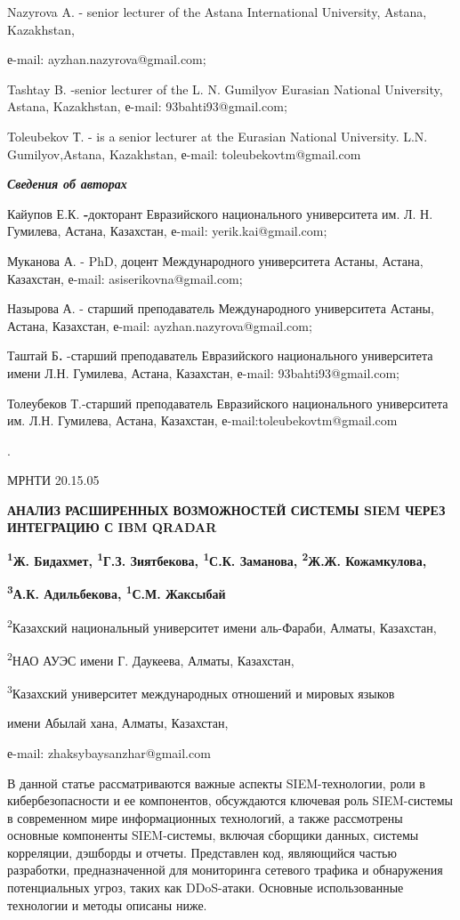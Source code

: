 Nazyrova A. - senior lecturer of the Astana International University,
Astana, Kazakhstan,

е-mail: ayzhan.nazyrova@gmail.com;

Tashtay B. -senior lecturer of the L. N. Gumilyov Eurasian National
University, Astana, Kazakhstan, е-mail: 93bahti93@gmail.com;

Toleubekov Т. - is a senior lecturer at the Eurasian National
University. L.N. Gumilyov,Astana, Kazakhstan, е-mail:
toleubekovtm@gmail.com

\emph{\textbf{Сведения об авторах}}

Кайупов Е.К. \textbf{-}докторант Евразийского национального университета
им. Л. Н. Гумилева, Астана, Казахстан, е-mail: yerik.kai@gmail.com;

Муканова А. - PhD, доцент Международного университета Астаны, Астана,
Казахстан, е-mail: asiserikovna@gmail.com;

Назырова А. - старший преподаватель Международного университета Астаны,
Астана, Казахстан, е-mail: ayzhan.nazyrova@gmail.com;

Таштай Б\textbf{.} -старший преподаватель Евразийского национального
университета имени Л.Н. Гумилева, Астана, Казахстан, е-mail:
93bahti93@gmail.com;

Толеубеков Т.-старший преподаватель Евразийского национального
университета им. Л.Н. Гумилева, Астана, Казахстан,
е-mail:toleubekovtm@gmail.com

.

МРНТИ 20.15.05

\textbf{АНАЛИЗ РАСШИРЕННЫХ ВОЗМОЖНОСТЕЙ СИСТЕМЫ SIEM ЧЕРЕЗ ИНТЕГРАЦИЮ С
IBM QRADAR}

\textbf{\textsuperscript{1}Ж. Бидахмет, \textsuperscript{1}Г.З.
Зиятбекова, \textsuperscript{1}С.К. Заманова, \textsuperscript{2}Ж.Ж.
Кожамкулова,}

\textbf{\textsuperscript{3}А.К. Адильбекова, \textsuperscript{1}С.М.
Жаксыбай}

\textsuperscript{2}Казахский национальный университет имени аль-Фараби,
Алматы, Казахстан,

\textsuperscript{2}НАО АУЭС имени Г. Даукеева, Алматы, Казахстан,

\textsuperscript{3}Казахский университет международных отношений и
мировых языков

имени Абылай хана, Алматы, Казахстан,

е-mail: zhaksybaysanzhar@gmail.com

В данной статье рассматриваются важные аспекты SIEM-технологии, роли в
кибербезопасности и ее компонентов, обсуждаются ключевая роль
SIEM-системы в современном мире информационных технологий, а также
рассмотрены основные компоненты SIEM-системы, включая сборщики данных,
системы корреляции, дэшборды и отчеты. Представлен код, являющийся
частью разработки, предназначенной для мониторинга сетевого трафика и
обнаружения потенциальных угроз, таких как DDoS-атаки. Основные
использованные технологии и методы описаны ниже.

